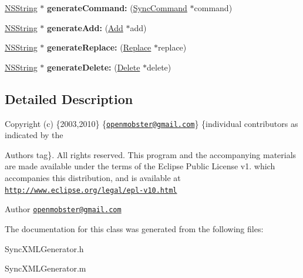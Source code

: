 \begin{DoxyCompactItemize}
\item 
\hypertarget{interface_sync_x_m_l_generator_a6f198ee7114739a866cac9d59ecdab05}{
\hyperlink{class_n_s_string}{\-N\-S\-String} $\ast$ {\bfseries generate\-Command\-:} (\hyperlink{interface_sync_command}{\-Sync\-Command} $\ast$command)}
\label{interface_sync_x_m_l_generator_a6f198ee7114739a866cac9d59ecdab05}

\item 
\hypertarget{interface_sync_x_m_l_generator_a69610456aec29a5d1ed1ff64880da186}{
\hyperlink{class_n_s_string}{\-N\-S\-String} $\ast$ {\bfseries generate\-Add\-:} (\hyperlink{interface_add}{\-Add} $\ast$add)}
\label{interface_sync_x_m_l_generator_a69610456aec29a5d1ed1ff64880da186}

\item 
\hypertarget{interface_sync_x_m_l_generator_a015ebb59be93fbec495252a10d40b8b5}{
\hyperlink{class_n_s_string}{\-N\-S\-String} $\ast$ {\bfseries generate\-Replace\-:} (\hyperlink{interface_replace}{\-Replace} $\ast$replace)}
\label{interface_sync_x_m_l_generator_a015ebb59be93fbec495252a10d40b8b5}

\item 
\hypertarget{interface_sync_x_m_l_generator_af71cc5609bde222bf5ad0cd2bec73859}{
\hyperlink{class_n_s_string}{\-N\-S\-String} $\ast$ {\bfseries generate\-Delete\-:} (\hyperlink{interface_delete}{\-Delete} $\ast$delete)}
\label{interface_sync_x_m_l_generator_af71cc5609bde222bf5ad0cd2bec73859}

\end{DoxyCompactItemize}


\subsection{\-Detailed \-Description}
\-Copyright (c) \{2003,2010\} \{\href{mailto:openmobster@gmail.com}{\tt openmobster@gmail.\-com}\} \{individual contributors as indicated by the \begin{DoxyAuthor}{\-Authors}
tag\}. \-All rights reserved. \-This program and the accompanying materials are made available under the terms of the \-Eclipse \-Public \-License v1. which accompanies this distribution, and is available at \href{http://www.eclipse.org/legal/epl-v10.html}{\tt http\-://www.\-eclipse.\-org/legal/epl-\/v10.\-html}
\end{DoxyAuthor}
\begin{DoxyAuthor}{\-Author}
\href{mailto:openmobster@gmail.com}{\tt openmobster@gmail.\-com} 
\end{DoxyAuthor}


\-The documentation for this class was generated from the following files\-:\begin{DoxyCompactItemize}
\item 
\-Sync\-X\-M\-L\-Generator.\-h\item 
\-Sync\-X\-M\-L\-Generator.\-m\end{DoxyCompactItemize}
